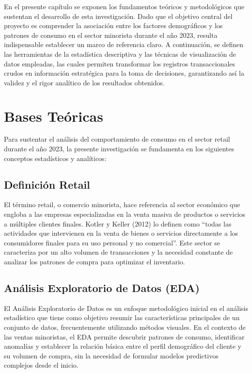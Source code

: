\documentclass[oneside,11pt]{Latex/Classes/PhDthesisPSnPDF}
\begin{document}
En el presente capítulo se exponen los fundamentos teóricos y
metodológicos que sustentan el desarrollo de esta investigación. Dado
que el objetivo central del proyecto es comprender la asociación entre
los factores demográficos y los patrones de consumo en el sector
minorista durante el año 2023, resulta indispensable establecer un marco
de referencia claro. A continuación, se definen las herramientas de la
estadística descriptiva y las técnicas de visualización de datos
empleadas, las cuales permiten transformar los registros transaccionales
crudos en información estratégica para la toma de decisiones,
garantizando así la validez y el rigor analítico de los resultados
obtenidos.

\section{Bases Teóricas}

Para sustentar el análisis del comportamiento de consumo en el sector
retail durante el año 2023, la presente investigación se fundamenta en
los siguientes conceptos estadísticos y analíticos:

\subsection{Definición Retail}

El término retail, o comercio minorista, hace referencia al sector
económico que engloba a las empresas especializadas en la venta masiva
de productos o servicios a múltiples clientes finales. Kotler y Keller
(2012) lo definen como ``todas las actividades que intervienen en la
venta de bienes o servicios directamente a los consumidores finales para
su uso personal y no comercial''. Este sector se caracteriza por un alto
volumen de transacciones y la necesidad constante de analizar los
patrones de compra para optimizar el inventario.

\subsection{Análisis Exploratorio de Datos (EDA)}

El Análisis Exploratorio de Datos es un enfoque metodológico inicial en
el análisis estadístico que tiene como objetivo resumir las
características principales de un conjunto de datos, frecuentemente
utilizando métodos visuales. En el contexto de las ventas minoristas, el
EDA permite descubrir patrones de consumo, identificar anomalías y
establecer la relación básica entre el perfil demográfico del cliente y
su volumen de compra, sin la necesidad de formular modelos predictivos
complejos desde el inicio.
\end{document}
